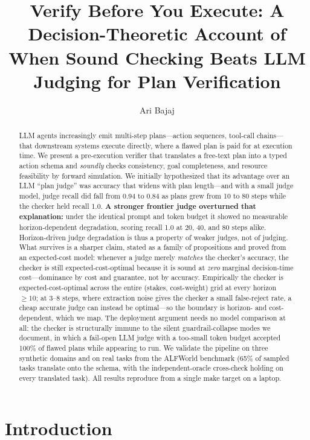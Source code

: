 \documentclass[letterpaper]{article}
\title{Verify Before You Execute: A Decision-Theoretic Account of\\
When Sound Checking Beats LLM Judging for Plan Verification}
\author{Ari Bajaj}
\begin{document}
\maketitle

\begin{abstract}
LLM agents increasingly emit multi-step plans---action sequences, tool-call
chains---that downstream systems execute directly, where a flawed plan is
paid for at execution time. We present a pre-execution verifier that
translates a free-text plan into a typed action schema and \emph{soundly}
checks consistency, goal completeness, and resource feasibility by forward
simulation. We initially hypothesized that its advantage over an LLM ``plan
judge'' was accuracy that widens with plan length---and with a small judge
model, judge recall did fall from 0.94 to 0.84 as plans grew from 10 to 80
steps while the checker held recall 1.0. \textbf{A stronger frontier judge
overturned that explanation:} under the identical prompt and token budget it
showed no measurable horizon-dependent degradation, scoring recall 1.0 at
20, 40, and 80 steps alike. Horizon-driven judge degradation is thus a
property of weaker judges, not of judging. What survives is a sharper claim,
stated as a family of propositions and proved from an expected-cost model:
whenever a judge merely \emph{matches} the checker's accuracy, the checker is
still expected-cost-optimal because it is sound at \emph{zero} marginal
decision-time cost---dominance by cost and guarantee, not by accuracy.
Empirically the checker is expected-cost-optimal across the entire (stakes,
cost-weight) grid at every horizon $\ge 10$; at 3--8 steps, where extraction
noise gives the checker a small false-reject rate, a cheap accurate judge can
instead be optimal---so the boundary is horizon- and cost-dependent, which we
map. The deployment argument needs no model comparison at all: the checker is
structurally immune to the silent guardrail-collapse modes we document, in
which a fail-open LLM judge with a too-small token budget accepted 100\% of
flawed plans while appearing to run. We validate the pipeline on three
synthetic domains and on real tasks from the ALFWorld benchmark (65\% of
sampled tasks translate onto the schema, with the independent-oracle
cross-check holding on every translated task). All results reproduce from a
single make target on a laptop.
\end{abstract}

\section{Introduction}
\end{document}
